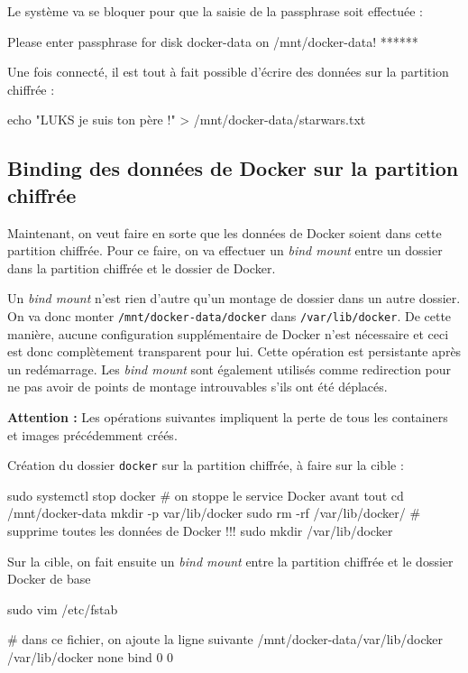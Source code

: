 \documentclass[11pt,a4paper,oneside]{report}
\newcommand{\code}[1]{\texttt{#1}}
\begin{document}
Le système va se bloquer pour que la saisie de la passphrase soit effectuée :
\begin{bashcode}
Please enter passphrase for disk docker-data on /mnt/docker-data! ******
\end{bashcode}

Une fois connecté, il est tout à fait possible d'écrire des données sur la partition chiffrée :
\begin{bashcode}
echo "LUKS je suis ton père !" > /mnt/docker-data/starwars.txt
\end{bashcode}


\subsection{Binding des données de Docker sur la partition chiffrée}
Maintenant, on veut faire en sorte que les données de Docker soient dans cette partition chiffrée. Pour ce faire, on va effectuer un \textit{bind mount} entre un dossier dans la partition chiffrée et le dossier de Docker.

Un \textit{bind mount} n'est rien d'autre qu'un montage de dossier dans un autre dossier. On va donc monter \code{/mnt/docker-data/docker} dans \code{/var/lib/docker}. De cette manière, aucune configuration supplémentaire de Docker n'est nécessaire et ceci est donc complètement transparent pour lui. Cette opération est persistante après un redémarrage. Les \textit{bind mount} sont également utilisés comme redirection pour ne pas avoir de points de montage introuvables s'ils ont été déplacés.

\textbf{Attention : } Les opérations suivantes impliquent la perte de tous les containers et images précédemment créés.

Création du dossier \code{docker} sur la partition chiffrée, à faire sur la cible :
\begin{bashcode}
sudo systemctl stop docker # on stoppe le service Docker avant tout
cd /mnt/docker-data
mkdir -p var/lib/docker
sudo rm -rf /var/lib/docker/ # supprime toutes les données de Docker !!!
sudo mkdir /var/lib/docker
\end{bashcode}

Sur la cible, on fait ensuite un \textit{bind mount} entre la partition chiffrée et le dossier Docker de base

\begin{bashcode}
sudo vim /etc/fstab

# dans ce fichier, on ajoute la ligne suivante
/mnt/docker-data/var/lib/docker /var/lib/docker none bind 0 0
\end{bashcode}
\end{document}
